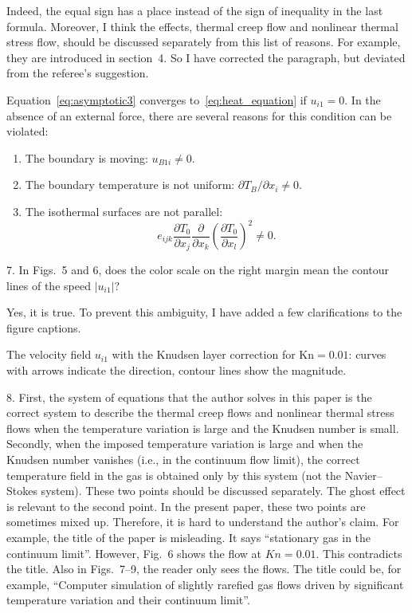 \documentclass{article}
\newcommand{\Kn}{\mathrm{Kn}}
\newcommand{\pder}[2][]{\frac{\partial#1}{\partial#2}}
\newcommand{\Pder}[2][]{\partial#1/\partial#2}
\begin{document}
Indeed, the equal sign has a place instead of the sign of inequality in the last formula.
Moreover, I think the effects, thermal creep flow and nonlinear thermal stress flow, should
be discussed separately from this list of reasons. For example, they are introduced in section~4.
So I have corrected the paragraph, but deviated from the referee's suggestion.
\begin{leftbar}
Equation~\eqref{eq:asymptotic3} converges to~\eqref{eq:heat_equation} if \(u_{i1} = 0\).
In the absence of an external force, there are several reasons for this condition can be violated:
\begin{enumerate}
	\item The boundary is moving: \(u_{B1i} \neq 0 \).
	\item The boundary temperature is not uniform: \(\Pder[T_B]{x_i} \neq 0 \).
	\item The isothermal surfaces are not parallel:
		\begin{equation}\label{eq:equilibrium}
			e_{ijk}\pder[T_0]{x_j}\pder{x_k}\left(\pder[T_0]{x_l}\right)^2 \neq 0.
		\end{equation}
\end{enumerate}
\end{leftbar}

\begin{quoting}
7. In Figs.~5 and 6, does the color scale on the right margin mean the
contour lines of the speed \(|u_{i1}|\)?
\end{quoting}

Yes, it is true. To prevent this ambiguity, I have added a few clarifications to the figure captions.

\begin{leftbar}
The velocity field \(u_{i1}\) with the Knudsen layer correction for \(\Kn=0.01\):
curves with arrows indicate the direction, contour lines show the magnitude.
\end{leftbar}

\begin{quoting}
8. First, the system of equations that the author solves in this paper
is the correct system to describe the thermal creep flows and nonlinear
thermal stress flows when the temperature variation is large and the
Knudsen number is small. Secondly, when the imposed temperature
variation is large and when the Knudsen number vanishes (i.e., in the
continuum flow limit), the correct temperature field in the gas is
obtained only by this system (not the Navier--Stokes system). These two
points should be discussed separately. The ghost effect is relevant to
the second point. In the present paper, these two points are sometimes
mixed up. Therefore, it is hard to understand the author's claim. For
example, the title of the paper is misleading. It says ``stationary gas
in the continuum limit''. However, Fig.~6 shows the flow at \(Kn=0.01\).
This contradicts the title. Also in Figs.~7--9, the reader only sees the
flows. The title could be, for example, ``Computer simulation of
slightly rarefied gas flows driven by significant temperature variation
and their continuum limit''.
\end{quoting}
\end{document}
